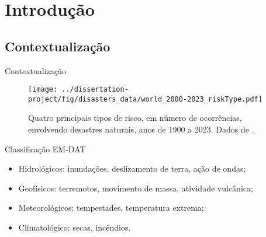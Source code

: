 \section{Introdução}

\subsection{Contextualização}


\begin{frame}{Contextualização}
    \begin{minipage}[c]{0.49\textwidth}
        \begin{figure}
            \centering
            \texttt{[image: ../dissertation-project/fig/disasters\_data/world\_2000-2023\_riskType.pdf]}
            \caption{Quatro principais tipos de risco, em número de ocorrências, envolvendo
            desastres naturais, anos de 1900 a 2023. Dados de \cite{emdat_2023}.}
        \end{figure}    
    \end{minipage}
    \hfill
    \begin{minipage}[c]{0.40\textwidth}
        \begin{exampleblock}{\small Classificação EM-DAT}
            \begin{itemize}
                \scriptsize
                \item Hidrológicos: inundações, deslizamento de terra, ação de ondas;
                \item Geofísicos: terremotos, movimento de massa, atividade vulcânica;
                \item Meteorológicos: tempestades, temperatura extrema;
                \item Climatológico: secas, incêndios. 
            \end{itemize}
        \end{exampleblock}
    \end{minipage}
\end{frame}


